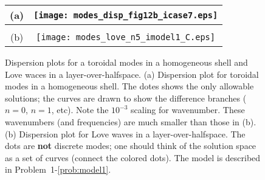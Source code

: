 \documentclass[11pt,titlepage,fleqn]{article}
\begin{document}




\clearpage\pagebreak
\begin{figure}
\centering
\begin{tabular}{cc}
(a) & \texttt{[image: modes\_disp\_fig12b\_icase7.eps]} \\ \hline
& \\
(b) & \texttt{[image: modes\_love\_n5\_imodel1\_C.eps]} 
\end{tabular}
\caption[]
{{
Dispersion plots for a toroidal modes in a homogeneous shell and Love waces in a layer-over-halfspace.
(a) Dispersion plot for toroidal modes in a homogeneous shell. The dotes shows the only allowable solutions; the curves are drawn to show the difference branches ($n=0$, $n=1$, etc). 
Note the $10^{-3}$ scaling for wavenumber. These wavenumbers (and frequencies) are much smaller than those in (b).
(b) Dispersion plot for Love waves in a layer-over-halfspace. The dots are {\bf not} discrete modes; one should think of the solution space as a set of curves (\ie connect the colored dots).
The model is described in Problem~1-\ref{prob:model1}.
\label{fig:dots}
}}
\end{figure}

\end{document}
